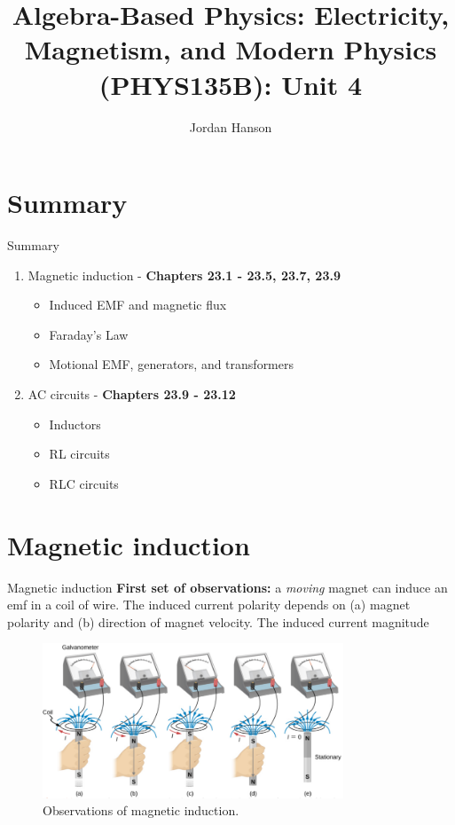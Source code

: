 \documentclass{beamer}
\title{Algebra-Based Physics: Electricity, Magnetism, and Modern Physics (PHYS135B): Unit 4}
\author{Jordan Hanson}
\institute{Whittier College Department of Physics and Astronomy}
\begin{document}
\maketitle

\section{Summary}

\begin{frame}{Summary}
\begin{enumerate}
\item Magnetic induction - \textbf{Chapters 23.1 - 23.5, 23.7, 23.9}
\begin{itemize}
\item Induced EMF and magnetic flux
\item Faraday's Law
\item Motional EMF, generators, and transformers
\end{itemize}
\item AC circuits - \textbf{Chapters 23.9 - 23.12}
\begin{itemize}
\item Inductors
\item RL circuits
\item RLC circuits
\end{itemize}
\end{enumerate}
\end{frame}

\section{Magnetic induction}

\begin{frame}{Magnetic induction}
\small
\textbf{\alert{First set of observations:}} a \textit{moving} magnet can induce an emf in a coil of wire.  The induced current polarity depends on (a) magnet polarity and (b) direction of magnet velocity.  The induced current magnitude 
\begin{figure}
\centering
\includegraphics[width=0.8\textwidth]{figures/farad.png}
\caption{\label{fig:farad1} Observations of magnetic induction.}
\end{figure}
\end{frame}
\end{document}
